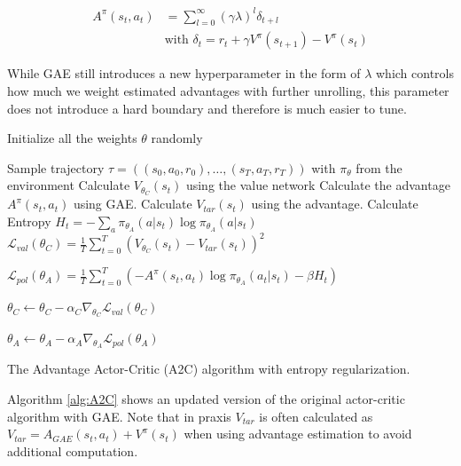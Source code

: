 \begin{align*}
  A^\pi(s_t, a_t) &= \sum^\infty_{l=0} (\gamma\lambda)^l \delta_{t+l} \\
  &\text{with } \delta_t = r_t + \gamma V^\pi(s_{t + 1}) - V^\pi(s_t) 
\end{align*}

While GAE still introduces a new hyperparameter in the form of $\lambda$ which controls how much we weight estimated advantages with further unrolling, this parameter does not introduce a hard boundary and therefore is much easier to tune. 

\begin{algorithm}[ht]
  Initialize all the weights $\theta$ randomly \;
    {
   Sample trajectory $\tau = ((s_0, a_0, r_0), \dots, (s_T, a_T, r_T))$ with $\pi_\theta$ from the environment \;
      {
      Calculate $V_{\theta_C}(s_t)$ using the value network \;
      Calculate the advantage $A^\pi(s_t, a_t)$ using GAE. \;
      Calculate $V_{tar}(s_t)$ using the advantage. \;
      Calculate Entropy $H_t = - \sum_a \pi_{\theta_A}(a|s_t) \log \pi_{\theta_A}(a|s_t)$ \;
    }
    $\mathcal{L}_{val}(\theta_C) = \frac{1}{T} \sum^T_{t=0}(V_{\theta_C}(s_t) - V_{tar}(s_t))^2$ 

    $\mathcal{L}_{pol}(\theta_A) = \frac{1}{T} \sum^T_{t=0}\left(-A^\pi(s_t, a_t) \log \pi_{\theta_A}(a_t|s_t) - \beta H_t\right)$ 

    $\theta_C \leftarrow \theta_C - \alpha_C \nabla_{\theta_C} \mathcal{L}_{val}(\theta_C)$ 
  
    $\theta_A \leftarrow \theta_A - \alpha_A \nabla_{\theta_A} \mathcal{L}_{pol}(\theta_A)$ 

  }

  \caption[The Advantage Actor-Critic Algorithm]{The Advantage Actor-Critic (A2C) algorithm with entropy regularization.}\label{alg:A2C}
 \end{algorithm}

Algorithm \ref{alg:A2C} shows an updated version of the original actor-critic algorithm with GAE. Note that in praxis $V_{tar}$ is often calculated as $V_{tar} = A_{GAE}(s_t, a_t) + V^\pi(s_t)$ when using advantage estimation to avoid additional computation. 

